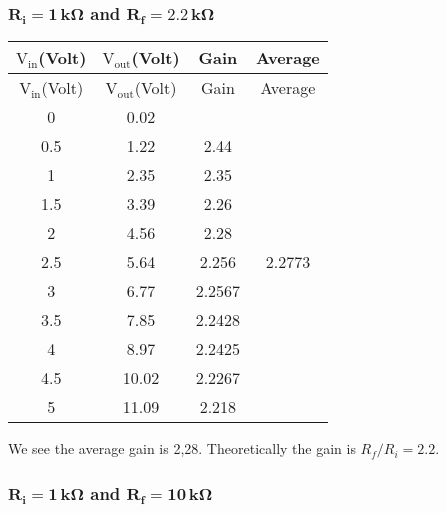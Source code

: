 \documentclass[12pt]{article}
\begin{document}
\subsubsection{$\mathbf{R_i = 1\, k \Omega}$ and $\mathbf{R_f = 2.2\, k \Omega}$}
\begin{longtable}{|c|c|c|c|}
	\hline
	$\mathrm{V_{in}}$(Volt) & $\mathrm{V_{out}}$(Volt) & Gain    & Average \\  
	\hline  
	\endfirsthead
	
	\hline
	$\mathrm{V_{in}}$(Volt) & $\mathrm{V_{out}}$(Volt) & Gain    & Average \\  
	\hline  
	\endhead
	\endfoot
	\endlastfoot
	
	0            & 0.02          &                 & \multirow{11}{*}{2.2773} \\ \cline{1-3}
	0.5          & 1.22          & 2.44            &                          \\ \cline{1-3}
	1            & 2.35          & 2.35            &                          \\ \cline{1-3}
	1.5          & 3.39          & 2.26            &                          \\ \cline{1-3}
	2            & 4.56          & 2.28            &                          \\ \cline{1-3}
	2.5          & 5.64          & 2.256           &                          \\ \cline{1-3}
	3            & 6.77          & 2.2567          &   						 \\ \cline{1-3}
	3.5          & 7.85          & 2.2428          &                          \\ \cline{1-3}
	4            & 8.97          & 2.2425          &                          \\ \cline{1-3}
	4.5          & 10.02         & 2.2267          &                          \\ \cline{1-3}
	5            & 11.09         & 2.218           &                          \\ \hline
\end{longtable}
We see the average gain is 2,28. Theoretically the gain is $ R_f/ R_i = 2.2 $. 
\subsubsection{$\mathbf{R_i = 1\, k \Omega}$ and $\mathbf{R_f = 10\, k \Omega}$}
\end{document}
